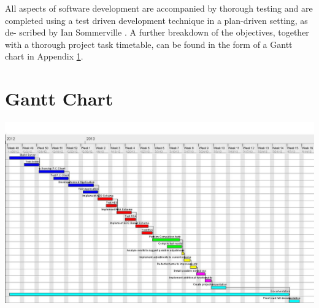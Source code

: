 \documentclass[a4paper,10pt]{report}
\begin{document}
All aspects of software development are accompanied by thorough testing and are completed using a test driven development technique in a plan-driven setting, as de-
scribed by Ian Sommerville \cite{iansommerville}. A further breakdown of the objectives, together with a thorough project task timetable, can be found in the form of a Gantt chart in Appendix \ref{A}.

\appendix
\chapter{Gantt Chart}\label{A}
\includegraphics[scale=0.35, angle=270]{ProgReportChart.jpg}


\end{document}
